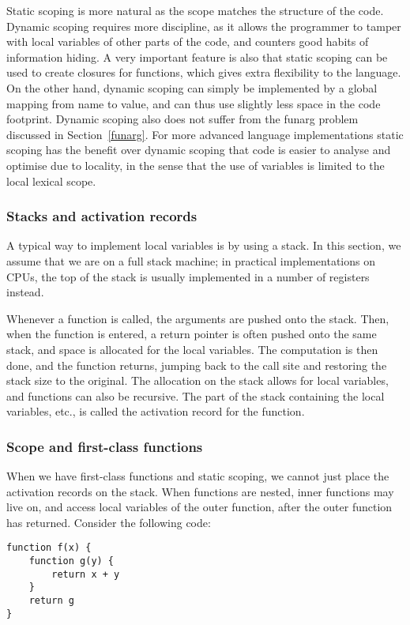 \documentclass[11pt]{report}
\begin{document}
Static scoping is more natural as the scope matches the structure of the code. Dynamic scoping requires more discipline, as it allows the programmer to tamper with local variables of other parts of the code, and counters good habits of information hiding. A very important feature is also that static scoping can be used to create closures for functions, which gives extra flexibility to the language.
On the other hand, dynamic scoping can simply be implemented by a global mapping from name to value, and can thus use slightly less space in the code footprint. 
Dynamic scoping also does not suffer from the funarg problem discussed in Section~\ref{funarg}.
For more advanced language implementations static scoping has the benefit over dynamic scoping that code is easier to analyse and optimise due to locality, in the sense that the use of variables is limited to the local lexical scope.

\subsubsection{Stacks and activation records}
A typical way to implement local variables is by using a stack.
In this section, we assume that we are on a full stack machine; 
in practical implementations on CPUs, the top of the stack is usually implemented in a number of registers instead.

Whenever a function is called, the arguments are pushed onto the stack. Then, when the function is entered, a return pointer is often pushed onto the same stack, and space is allocated for the local variables. The computation is then done, and the function returns, jumping back to the call site and restoring the stack size to the original.
The allocation on the stack allows for local variables, and functions can also be recursive. The part of the stack containing the local variables, etc., is called the activation record for the function.

\subsubsection{Scope and first-class functions}

When we have first-class functions and static scoping, we cannot just place the activation records on the stack. When functions are nested, inner functions may live on, and access local variables of the outer function, after the outer function has returned. Consider the following code:
\begin{verbatim}
function f(x) {
    function g(y) {
        return x + y
    }
    return g
}
\end{verbatim}
\end{document}
